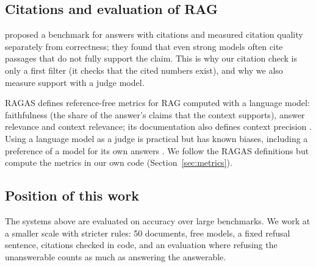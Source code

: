 \subsection{Citations and evaluation of RAG}

\citet{gao2023alce} proposed a benchmark for answers with citations and measured citation quality separately from correctness; they found that even strong models often cite passages that do not fully support the claim. This is why our citation check is only a first filter (it checks that the cited numbers exist), and why we also measure support with a judge model.

RAGAS \citep{es2023ragas} defines reference-free metrics for RAG computed with a language model: faithfulness (the share of the answer's claims that the context supports), answer relevance and context relevance; its documentation also defines context precision \citep{ragascontextprecision}. Using a language model as a judge is practical but has known biases, including a preference of a model for its own answers \citep{zheng2023judge}. We follow the RAGAS definitions but compute the metrics in our own code (Section~\ref{sec:metrics}).

\subsection{Position of this work}

The systems above are evaluated on accuracy over large benchmarks. We work at a smaller scale with stricter rules: 50 documents, free models, a fixed refusal sentence, citations checked in code, and an evaluation where refusing the unanswerable counts as much as answering the answerable.

